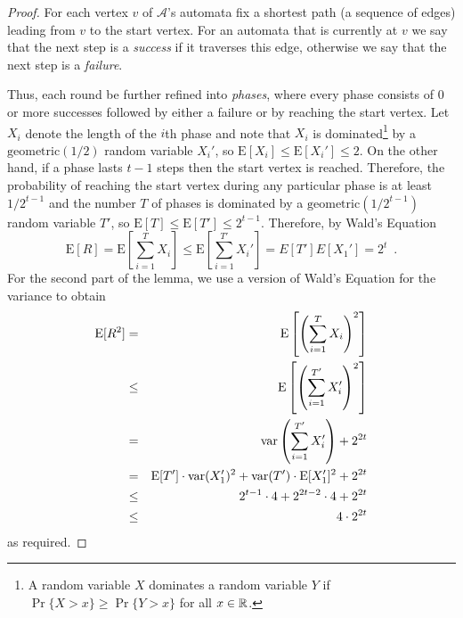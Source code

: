 \documentclass[lotsofwhite]{patmorin}
\newcommand{\E}{\mathrm{E}}
\DeclareMathOperator{\var}{var}
\begin{document}
\begin{proof}
For each vertex $v$ of $\mathcal{A}$'s automata fix a shortest path
(a sequence of edges) leading from $v$ to the start vertex.  For an
automata that is currently at $v$ we say that the next step is a
\emph{success} if it traverses this edge, otherwise we say that the
next step is a \emph{failure}.

Thus, each round be further refined into \emph{phases}, where every
phase consists of 0 or more successes followed by either a failure or
by reaching the start vertex.  Let $X_i$ denote the length of the
$i$th phase and note that $X_i$ is dominated\footnote{A random
variable $X$ dominates a random variable $Y$ if $\Pr\{X > x\}\ge
\Pr\{Y > x\}$ for all $x\in\mathbb{R}$.} by a $\mathrm{geometric}(1/2)$ random
variable $X_i'$, so $\E[X_i]\le\E[X_i']\le 2$.  On the other hand, if a phase lasts
$t-1$ steps then the start vertex is reached.  Therefore, the
probability of reaching the start vertex during any particular phase
is at least $1/2^{t-1}$ and the number $T$ of phases is dominated by a
$\mathrm{geometric}(1/2^{t-1})$ random variable $T'$, so
$\E[T]\le\E[T']\le 2^{t-1}$.
Therefore, by Wald's Equation
\[
  \E[R] = \E\left[\sum_{i=1}^T X_i\right]\le \E\left[\sum_{i=1}^{T'}
X_i'\right] = E[T']E[X_1'] = 2^t \enspace .
\]
For the second part of the lemma, we use a version of Wald's Equation
for the variance to obtain
\begin{eqnarray*}
  \E[R^2] & = & \E\left[\left(\sum_{i=1}^T X_i\right)^2\right] \\
          &\le& \E\left[\left(\sum_{i=1}^{T'} X_i'\right)^2\right] \\
          & = & \var\left(\sum_{i=1}^{T'} X_i'\right) + 2^{2t} \\
          & = & \E[T']\cdot\var(X_1')^2 + \var(T')\cdot\E[X_1']^2 + 2^{2t} \\
          & \le & 2^{t-1}\cdot 4 + 2^{2t-2}\cdot 4 + 2^{2t} \\
          & \le & 4\cdot 2^{2t}
\comment{
          & = & \E\left[\sum_{i=1}^{T'} (X_i')^2
                + \sum_{i=1}^{T'}\sum_{j=i+1}^{T'} 2X_i'X_j' \right] \\
          & = & \E\left[\sum_{i=1}^{T'} (X_i')^2\right]
                + \E\left[\sum_{i=1}^{T'}\sum_{j=i+1}^{T'} 2X_i'X_j'\right] \\
          & = & \E[T']\cdot \E\left[(X_i')^2\right]
                + \E\left[\sum_{i=1}^T\sum_{j=i+1}^{T'} 2X_i'X_j'\right] \\
}
\end{eqnarray*}
as required.
\end{proof}
\end{document}

